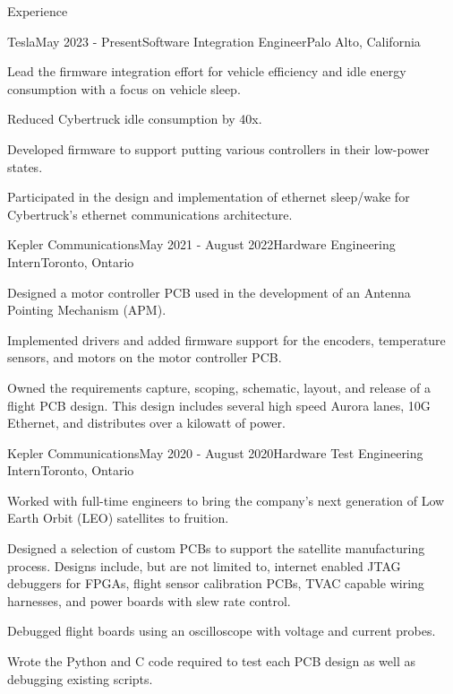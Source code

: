 \documentclass{resume} %
\begin{document}
\begin{rSection}{Experience}

\begin{rSubsection}{Tesla}{May 2023 - Present}{Software Integration Engineer}{Palo Alto, California}
  \item Lead the firmware integration effort for vehicle efficiency and idle energy consumption with a focus on vehicle sleep.
  \item Reduced Cybertruck idle consumption by 40x.
  \item Developed firmware to support putting various controllers in their low-power states.
  \item Participated in the design and implementation of ethernet sleep/wake for Cybertruck's ethernet communications architecture.
\end{rSubsection}

\begin{rSubsection}{Kepler Communications}{May 2021 - August 2022}{Hardware
    Engineering Intern}{Toronto, Ontario}
    \item Designed a motor controller PCB used in the development of an Antenna Pointing Mechanism (APM).
    \item Implemented drivers and added firmware support for the encoders, temperature sensors, and motors on the motor controller PCB.
    \item Owned the requirements capture, scoping, schematic, layout, and release of a flight PCB design. This design includes several high speed Aurora lanes, 10G Ethernet, and distributes over a kilowatt of power.
\end{rSubsection}

\begin{rSubsection}{Kepler Communications}{May 2020 - August 2020}{Hardware
    Test Engineering Intern}{Toronto, Ontario}
\item Worked with full-time engineers to bring the company's next generation of
  Low Earth Orbit (LEO) satellites to fruition.
\item Designed a selection of custom PCBs to support the satellite manufacturing
  process. Designs include, but are not limited to, internet enabled JTAG
  debuggers for FPGAs, flight sensor calibration PCBs, TVAC capable wiring
  harnesses, and power boards with slew rate control.
\item Debugged flight boards using an oscilloscope with voltage
  and current probes.
\item Wrote the Python and C code required to test each PCB design as well as
  debugging existing scripts.
\end{rSubsection}


\end{rSection}
\end{document}
